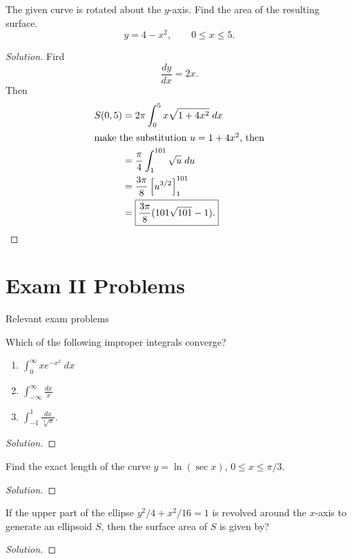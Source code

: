 \begin{problem}[WebAssign, HW 17, \# 8]
The given curve is rotated about the $y$-axis. Find the area of the
resulting surface.
\[
  y=4-x^2,\qquad 0\leq x\leq 5.
\]
\end{problem}
\begin{proof}[Solution]
Fird
\[
\frac{dy}{dx}=2x.
\]
Then
\begin{align*}
S(0,5)
&=2\pi\int_0^5 x\sqrt{1+4x^2}\;dx\\
\intertext{make the substitution $u=1+4x^2$, then}
&=\frac{\pi}{4}\int_1^{101}\sqrt{u}\;du\\
&=\frac{3\pi}{8}\left[u^{3/2}\right]_1^{101}\\
&=\boxed{\frac{3\pi}{8}(101\sqrt{101}-1).}
\end{align*}
\end{proof}
\chapter{Exam II Problems}
Relevant exam problems
\begin{problem}[Spring 2014, \# 8]
Which of the following improper integrals converge?
\begin{enumerate}[label=\MakeUppercase{\roman*}.]
\item $\displaystyle\int_0^\infty xe^{-x^2}\;dx$
\item $\displaystyle\int_{-\infty}^\infty\frac{dx}{x}$
\item $\displaystyle\int_{-1}^1\frac{dx}{\sqrt[3]{x}}$.
\end{enumerate}
\end{problem}
\begin{proof}[Solution]
\end{proof}

\begin{problem}[Spring 2014, \# 9]
Find the exact length of the curve $y=\ln(\sec x)$, $0\leq x\leq\pi/3$.
\end{problem}
\begin{proof}[Solution]
\end{proof}

\begin{problem}[Spring 2015, \# 9]
If the upper part of the ellipse $y^2/4+x^2/16=1$ is revolved around the
$x$-axis to generate an ellipsoid $S$, then the surface area of $S$ is
given by?
\end{problem}
\begin{proof}[Solution]
\end{proof}

